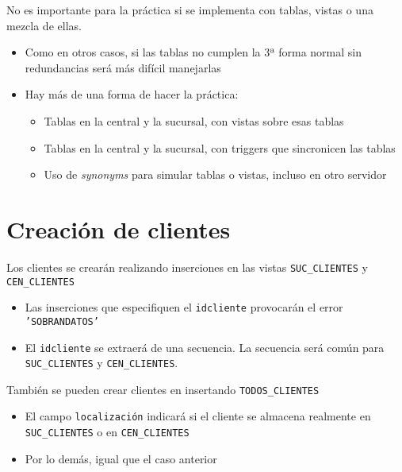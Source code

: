 \documentclass[a4paper]{article}
\begin{document}
\begin{Aviso}
No es importante para la práctica si se implementa con tablas, vistas o una mezcla de ellas.
\begin{itemize}
\item Como en otros casos, si las tablas no cumplen la 3ª forma normal sin redundancias será más difícil manejarlas
\item Hay más de una forma de hacer la práctica:
\begin{itemize}
\item Tablas en la central y la sucursal, con vistas sobre esas tablas
\item Tablas en la central y la sucursal, con triggers que sincronicen las tablas
\item Uso de \emph{synonyms} para simular tablas o vistas, incluso en otro servidor
\end{itemize}
\end{itemize}
\end{Aviso}

\newpage
\section{Creación de clientes}
\label{sec:org0000012}
Los clientes se crearán realizando inserciones en las vistas \texttt{SUC\_CLIENTES} y \texttt{CEN\_CLIENTES}
\begin{itemize}
\item Las inserciones que especifiquen el \texttt{idcliente} provocarán el error \texttt{'SOBRANDATOS'}
\item El \texttt{idcliente} se extraerá de una secuencia. La secuencia será común para \texttt{SUC\_CLIENTES} y \texttt{CEN\_CLIENTES}.
\end{itemize}
También se pueden crear clientes en insertando \texttt{TODOS\_CLIENTES}
\begin{itemize}
\item El campo \texttt{localización} indicará si el cliente se almacena realmente en \texttt{SUC\_CLIENTES} o en \texttt{CEN\_CLIENTES}
\item Por lo demás, igual que el caso anterior
\end{itemize}
\end{document}
